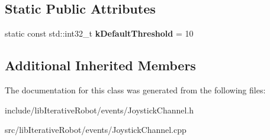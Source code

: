 \subsection*{Static Public Attributes}
\begin{DoxyCompactItemize}
\item 
\mbox{\label{classlib_iterative_robot_1_1_joystick_channel_a29c1fe2a3e5d09fc47d9d7fc4f7b5288}} 
static const std\+::int32\+\_\+t {\bfseries k\+Default\+Threshold} = 10
\end{DoxyCompactItemize}
\subsection*{Additional Inherited Members}


The documentation for this class was generated from the following files\+:\begin{DoxyCompactItemize}
\item 
include/lib\+Iterative\+Robot/events/Joystick\+Channel.\+h\item 
src/lib\+Iterative\+Robot/events/Joystick\+Channel.\+cpp\end{DoxyCompactItemize}
